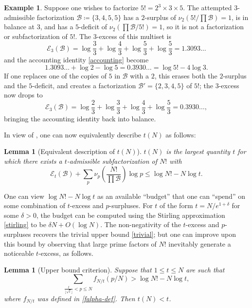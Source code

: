 \documentclass[12pt,a4paper,reqno]{amsart}
\numberwithin{equation}{section}
\theoremstyle{plain}
\newtheorem{lemma}[theorem]{Lemma}
\theoremstyle{definition}
\newtheorem{example}[theorem]{Example}
\newcommand\tuple{{\mathcal B}}
\newcommand\excess{{\mathcal{E}}}
\begin{document}
\begin{example} Suppose one wishes to factorize $5! = 2^3 \times 3 \times 5$.  The attempted $3$-admissible factorization $\tuple \coloneqq \{3,4,5,5\}$ has a $2$-surplus of $\nu_2(5!/\prod \tuple) = 1$, is in balance at $3$, and has a $5$-deficit of $\nu_2(\prod \tuple/5!) = 1$, so it is not a factorization or subfactorization of $5!$.  The $3$-excess of this multiset is
  $$ \excess_3(\tuple) = \log \frac{3}{3} + \log \frac{4}{3} + \log \frac{5}{3} + \log \frac{5}{3} = 1.3093\dots$$
  and the accounting identity \eqref{accounting} become
  $$ 1.3093\dots + \log 2 - \log 5 = 0.3930\dots = \log 5! - 4 \log 3.$$
  If one replaces one of the copies of $5$ in ${\mathcal B}$ with a $2$, this erases both the $2$-surplus and the $5$-deficit, and creates a factorization $\tuple' = \{2,3,4,5\}$ of $5!$; the $3$-excess now drops to
  $$ \excess_3(\tuple) = \log \frac{2}{3} + \log \frac{3}{3} + \log \frac{4}{3} + \log \frac{5}{3}  = 0.3930\dots,$$
  bringing the accounting identity back into balance.
\end{example}
  
In view of , one can now equivalently describe 
$t(N)$ as follows:

\begin{lemma}[Equivalent description of $t(N)$]\label{t-descrip}  $t(N)$ is the largest quantity $t$ for which there exists a $t$-admissible subfactorization of $N!$ with
$$ \excess_t(\tuple) + \sum_p \nu_p\left( \frac{N!}{\prod \tuple} \right) \log p \leq \log N! - N \log t.$$
\end{lemma}

One can view $\log N! - N\log t$ as an available ``budget'' that one can ``spend'' on some combination of $t$-excess and $p$-surpluses.  For $t$ of the form $t = N/e^{1+\delta}$ for some $\delta>0$, the budget can be computed using the Stirling approximation \eqref{stirling} to be $\delta N + O(\log N)$.  The non-negativity of the $t$-excess and $p$-surpluses recovers the trivial upper bound \eqref{trivial}; but one can improve upon this bound by observing that large prime factors of $N!$ inevitably generate a noticeable $t$-excess, as follows.  

\begin{lemma}[Upper bound criterion]\label{upper-crit}  Suppose that $1 \leq t \leq N$ are such that
  \begin{equation}\label{contra}
     \sum_{\frac{t}{\lfloor\sqrt{t}\rfloor} < p \leq N} f_{N/t}(p/N) > \log N! - N \log t,
  \end{equation}
  where $f_{N/t}$ was defined in \eqref{falpha-def}.
  Then $t(N) < t$.
  \end{lemma}
\end{document}
